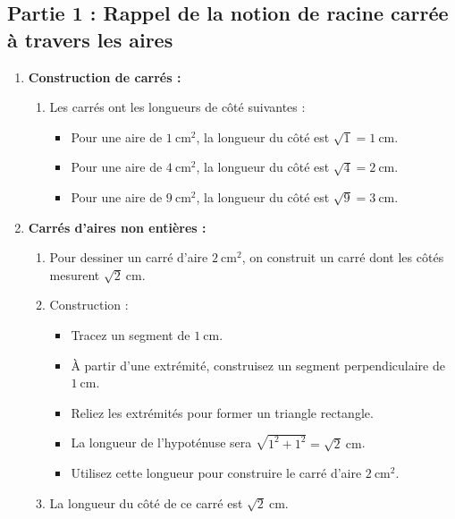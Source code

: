 \documentclass{article}
\title{\Document\ \Titre \Type}
\author{}
\date{}
\begin{document}
\pagestyle{fancy}
\fancyhead{} %
\fancyhead[R]{\Structure}
\fancyhead[L]{\Niveau}
\fancyfoot{} %
\fancyfoot[C]{\thepage}

\setlength{\headsep}{0pt}

\maketitle
\vspace{-4em}

\subsection*{Partie 1 : Rappel de la notion de racine carrée à travers les aires}

\begin{enumerate}
    \item \textbf{Construction de carrés :}
    \begin{enumerate}
        \item Les carrés ont les longueurs de côté suivantes :
        \begin{itemize}
            \item Pour une aire de $1~\text{cm}^2$, la longueur du côté est $\sqrt{1} = 1~\text{cm}$.
            \item Pour une aire de $4~\text{cm}^2$, la longueur du côté est $\sqrt{4} = 2~\text{cm}$.
            \item Pour une aire de $9~\text{cm}^2$, la longueur du côté est $\sqrt{9} = 3~\text{cm}$.
        \end{itemize}
    \end{enumerate}
    \item \textbf{Carrés d'aires non entières :}
    \begin{enumerate}
        \item Pour dessiner un carré d'aire $2~\text{cm}^2$, on construit un carré dont les côtés mesurent $\sqrt{2}~\text{cm}$.
        \item Construction :
        \begin{itemize}
            \item Tracez un segment de $1~\text{cm}$.
            \item À partir d'une extrémité, construisez un segment perpendiculaire de $1~\text{cm}$.
            \item Reliez les extrémités pour former un triangle rectangle.
            \item La longueur de l'hypoténuse sera $\sqrt{1^2 + 1^2} = \sqrt{2}~\text{cm}$.
            \item Utilisez cette longueur pour construire le carré d'aire $2~\text{cm}^2$.
        \end{itemize}
        \item La longueur du côté de ce carré est $\sqrt{2}~\text{cm}$.
    \end{enumerate}
\end{enumerate}
\end{document}
